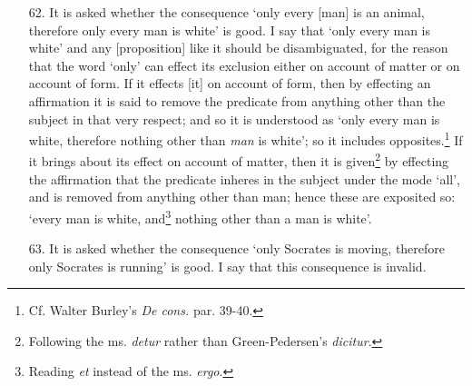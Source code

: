 \documentclass[]{article}
\begin{document}
\begin{enumerate}
\item[62.] It is asked whether the consequence `only every [man] is an animal, therefore only every man is white' is good. I say that `only every man is white' and any [proposition] like it should be disambiguated, for the reason that the word `only' can effect its exclusion either on account of matter or on account of form. If it effects [it] on account of form, then by effecting an affirmation it is said to remove the predicate from anything other than the subject in that very respect; and so it is understood as `only every man is white, therefore nothing other than \textit{man} is white'; so it includes opposites.\footnote{Cf. Walter Burley's \textit{De cons.} par. 39-40.} If it brings about its effect on account of matter, then it is given\footnote{Following the ms. \textit{detur} rather than Green-Pedersen's \textit{dicitur}.} by effecting the affirmation that the predicate inheres in the subject under the mode `all', and is removed from anything other than man; hence these are exposited so: `every man is white, and\footnote{Reading \textit{et} instead of the ms. \textit{ergo}.} nothing other than a man is white'. 
\item[63.] It is asked whether the consequence `only Socrates is moving, therefore only Socrates is running' is good. I say that this consequence is invalid.


\end{enumerate}
\end{document}

